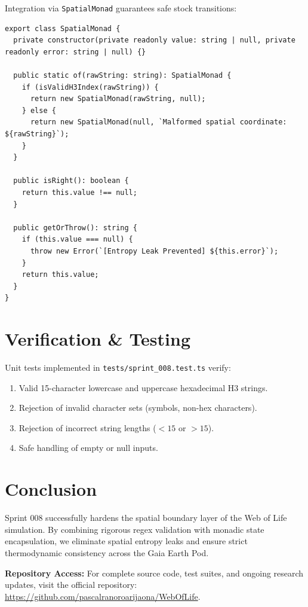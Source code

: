 \documentclass[11pt, a4paper]{article}
\begin{document}
Integration via \texttt{SpatialMonad} guarantees safe stock transitions:

\begin{verbatim}
export class SpatialMonad {
  private constructor(private readonly value: string | null, private readonly error: string | null) {}

  public static of(rawString: string): SpatialMonad {
    if (isValidH3Index(rawString)) {
      return new SpatialMonad(rawString, null);
    } else {
      return new SpatialMonad(null, `Malformed spatial coordinate: ${rawString}`);
    }
  }

  public isRight(): boolean {
    return this.value !== null;
  }

  public getOrThrow(): string {
    if (this.value === null) {
      throw new Error(`[Entropy Leak Prevented] ${this.error}`);
    }
    return this.value;
  }
}
\end{verbatim}

\section{Verification \& Testing}
Unit tests implemented in \texttt{tests/sprint\_008.test.ts} verify:
\begin{enumerate}
    \item Valid 15-character lowercase and uppercase hexadecimal H3 strings.
    \item Rejection of invalid character sets (symbols, non-hex characters).
    \item Rejection of incorrect string lengths ($<15$ or $>15$).
    \item Safe handling of empty or null inputs.
\end{enumerate}

\section{Conclusion}
Sprint 008 successfully hardens the spatial boundary layer of the Web of Life simulation. By combining rigorous regex validation with monadic state encapsulation, we eliminate spatial entropy leaks and ensure strict thermodynamic consistency across the Gaia Earth Pod.

\vspace{1em}
\noindent\textbf{Repository Access:} For complete source code, test suites, and ongoing research updates, visit the official repository: \url{https://github.com/pascalranoroarijaona/WebOfLife}.
\end{document}
